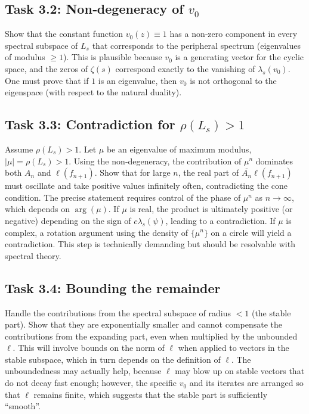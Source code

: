 \documentclass[11pt,a4paper]{article}
\begin{document}
\subsection{Task 3.2: Non‑degeneracy of $v_0$}
Show that the constant function $v_0(z) \equiv 1$ has a non‑zero component in every spectral subspace of $L_s$ that corresponds to the peripheral spectrum (eigenvalues of modulus $\ge 1$).  This is plausible because $v_0$ is a generating vector for the cyclic space, and the zeros of $\zeta(s)$ correspond exactly to the vanishing of $\lambda_s(v_0)$.  One must prove that if $1$ is an eigenvalue, then $v_0$ is not orthogonal to the eigenspace (with respect to the natural duality).

\subsection{Task 3.3: Contradiction for $\rho(L_s) > 1$}
Assume $\rho(L_s) > 1$.  Let $\mu$ be an eigenvalue of maximum modulus, $|\mu| = \rho(L_s) > 1$.  Using the non‑degeneracy, the contribution of $\mu^n$ dominates both $A_n$ and $\ell(f_{n+1})$.  Show that for large $n$, the real part of $\overline{A_n} \ell( f_{n+1} )$ must oscillate and take positive values infinitely often, contradicting the cone condition.  The precise statement requires control of the phase of $\mu^n$ as $n \to \infty$, which depends on $\arg(\mu)$.  If $\mu$ is real, the product is ultimately positive (or negative) depending on the sign of $c \lambda_s(\psi)$, leading to a contradiction.  If $\mu$ is complex, a rotation argument using the density of $\{ \mu^n \}$ on a circle will yield a contradiction.  This step is technically demanding but should be resolvable with spectral theory.

\subsection{Task 3.4: Bounding the remainder}
Handle the contributions from the spectral subspace of radius $< 1$ (the stable part).  Show that they are exponentially smaller and cannot compensate the contributions from the expanding part, even when multiplied by the unbounded $\ell$.  This will involve bounds on the norm of $\ell$ when applied to vectors in the stable subspace, which in turn depends on the definition of $\ell$.  The unboundedness may actually help, because $\ell$ may blow up on stable vectors that do not decay fast enough; however, the specific $v_0$ and its iterates are arranged so that $\ell$ remains finite, which suggests that the stable part is sufficiently ``smooth''.
\end{document}
